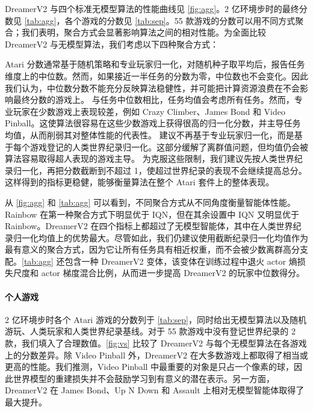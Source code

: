 


DreamerV2 与四个标准无模型算法的性能曲线见 \cref{fig:agg}。2 亿环境步时的最终分数见 \cref{tab:agg}，各个游戏的分数见 \cref{tab:sep}。55 款游戏的分数可以用不同方式聚合；我们表明，聚合方式会显著影响算法之间的相对性能。为全面比较 DreamerV2 与无模型算法，我们考虑以下四种聚合方式：

\begin{itemize}
 Atari 分数通常基于随机策略和专业玩家归一化，对随机种子取平均后，报告任务维度上的中位数\citep{mnih2015dqn,mnih2016a3c}。然而，如果接近一半任务的分数为零，中位数也不会变化。因此我们认为，中位数分数不能充分反映算法稳健性，并可能把计算资源浪费在不会影响最终分数的游戏上。
 与任务中位数相比，任务均值会考虑所有任务。然而，专业玩家在少数游戏上表现较差，例如 Crazy Climber、James Bond 和 Video Pinball。这使算法很容易在这些少数游戏上获得很高的归一化分数，并主导任务均值，从而削弱其对整体性能的代表性。
 \citet{toromanoff2019atarirecords} 建议不再基于专业玩家归一化，而是基于每个游戏登记的人类世界纪录归一化。这部分缓解了离群值问题，但均值仍会被算法容易取得超人表现的游戏主导。
 为克服这些限制，我们建议先按人类世界纪录归一化，再把分数截断到不超过 1，使超过世界纪录的表现不会继续提高总分。这样得到的指标更稳健，能够衡量算法在整个 Atari 套件上的整体表现。
\end{itemize}

从 \cref{fig:agg} 和 \cref{tab:agg} 可以看到，不同聚合方式从不同角度衡量智能体性能。Rainbow 在第一种聚合方式下明显优于 IQN，但在其余设置中 IQN 又明显优于 Rainbow。DreamerV2 在四个指标上都超过了无模型智能体，其中在人类世界纪录归一化均值上的优势最大。尽管如此，我们仍建议使用截断纪录归一化均值作为最有意义的聚合方式，因为它让所有任务具有相近权重，而不会被少数离群高分支配。\cref{tab:agg} 还包含一种 DreamerV2 变体，该变体在训练过程中退火 actor 熵损失尺度和 actor 梯度混合比例，从而进一步提高 DreamerV2 的玩家中位数得分。

\paragraph{个人游戏}

2 亿环境步时各个 Atari 游戏的分数列于 \cref{tab:sep}，同时给出无模型算法以及随机游玩、人类玩家和人类世界纪录基线。对于 55 款游戏中没有登记世界纪录的 2 款，我们填入了合理数值。\cref{fig:vs} 比较了 DreamerV2 与每个无模型算法在各游戏上的分数差异。除 Video Pinball 外，DreamerV2 在大多数游戏上都取得了相当或更高的性能。我们推测，Video Pinball 中最重要的对象是只占一个像素的球，因此世界模型的重建损失并不会鼓励学习到有意义的潜在表示。另一方面，DreamerV2 在 James Bond、Up N Down 和 Assault 上相对无模型智能体取得了最大提升。

